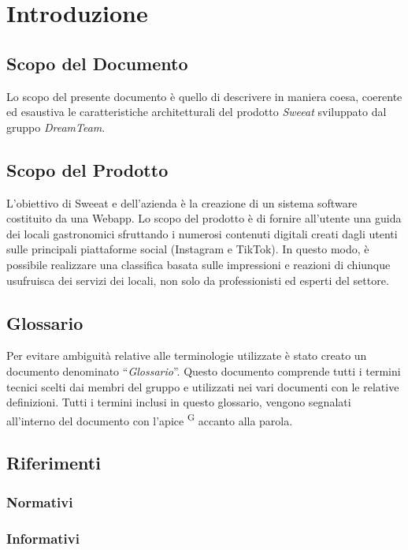 \section{Introduzione}

\subsection{Scopo del Documento}
Lo scopo del presente documento è quello di descrivere in maniera coesa, coerente ed esaustiva le caratteristiche architetturali del prodotto \textit{Sweeat} sviluppato dal gruppo \textit{DreamTeam}.


\subsection{Scopo del Prodotto}
L’obiettivo di Sweeat e dell’azienda \zd è la creazione di un sistema software costituito da una Webapp. Lo scopo del prodotto è di fornire all’utente una guida dei locali gastronomici sfruttando i numerosi contenuti digitali creati dagli utenti sulle principali piattaforme social (Instagram e TikTok).
In questo modo, è possibile realizzare una classifica basata sulle impressioni e reazioni di chiunque usufruisca dei servizi dei locali, non solo da professionisti ed esperti del settore.


\subsection{Glossario}
Per evitare ambiguità relative alle terminologie utilizzate è stato creato un documento denominato “\textit{Glossario}”. Questo documento comprende tutti i termini tecnici scelti dai membri del gruppo e utilizzati nei vari documenti con le relative definizioni. Tutti i termini inclusi in questo glossario, vengono segnalati all'interno del documento con l'apice \textsuperscript{G} accanto alla parola.

\subsection{Riferimenti}
\subsubsection{Normativi}

\subsubsection{Informativi}